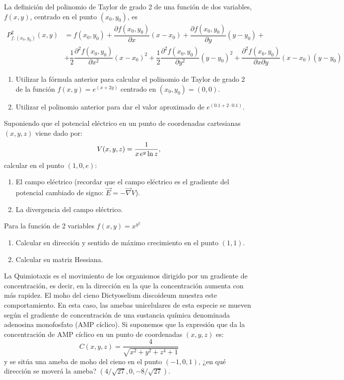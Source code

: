 {La definición del polinomio de Taylor de grado 2 de una función de dos variables, $f(x,y)$, centrado en el punto $(x_{0},y_{0})$, es
\begin{align*}
P_{f,(x_0,y_0)}^{2}(x,y)&= f(x_{0},y_{0})+\dfrac{\partial f(x_{0},y_{0})}{\partial x}(x-x_{0})+\dfrac{\partial f(x_{0},y_{0})}{\partial y}(y-y_{0})+\\
&+\dfrac{1}{2}\dfrac{\partial ^{2}f(x_{0},y_{0})}{\partial x^{2}}(x-x_{0})^{2}+\dfrac{1}{2}\dfrac{\partial ^{2}f(x_{0},y_{0})}{\partial y^{2}}(y-y_{0})^{2}+\dfrac{\partial ^{2}f(x_{0},y_{0})}{\partial x\partial y}(x-x_{0})(y-y_{0})
\end{align*}
\begin{enumerate}
\item  Utilizar la fórmula anterior para calcular el polinomio de Taylor de grado 2 de la función $f(x,y)=e^{(x+2y)}$ centrado en $(x_{0},y_{0})=(0,0)$.
\item  Utilizar el polinomio anterior para dar el valor aproximado de $e^{(0.1+2\cdot 0.1)}$.
\end{enumerate}
}


{Suponiendo que el potencial eléctrico en un punto de coordenadas cartesianas $(x,y,z)$ viene dado por:
\[
V(x,y,z) = \frac{1} {{x{\kern 1pt} e^y \ln z}},
\]
calcular en el punto $(1,0,e)$:
\begin{enumerate}
\item El campo eléctrico (recordar que el campo eléctrico es el gradiente del potencial cambiado de signo: $\vec E =  - \vec\nabla V$).
\item La divergencia del campo eléctrico.
\end{enumerate}
}


{Para la función de 2 variables $f(x,y) = x^{y^2}$
\begin{enumerate}
\item Calcular su dirección y sentido de máximo crecimiento en el punto $(1,1)$.
\item Calcular su matriz Hessiana.
\end{enumerate}
}


{La Quimiotaxis es el movimiento de los organismos dirigido por un gradiente de concentración, es decir, en la dirección
en la que la concentración aumenta con más rapidez. El moho del cieno Dictyoselium discoideum muestra este
comportamiento. En esta caso, las amebas unicelulares de esta especie se mueven según el gradiente de concentración de
una sustancia química denominada adenosina monofosfato (AMP cíclico). Si suponemos que la expresión que da la
concentración de AMP cíclico en un punto de coordenadas $(x,y,z)$ es:
\[
C(x,y,z) = \frac{4} {{\sqrt {x^2  + y^2  + z^4  + 1} }}
\]
y se sitúa una ameba de moho del cieno en el punto $(-1,0,1)$, ¿en qué dirección se moverá la ameba?
}
{$(4/\sqrt{27}, 0, -8/\sqrt{27})$.
}
{
}



